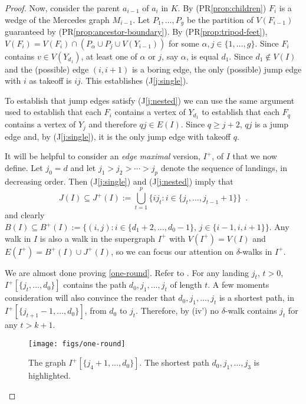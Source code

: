 \documentclass{patmorin}
\renewcommand{\propref}[1]{(PR\ref{prop:#1})}
\newcommand{\jref}[1]{(J\ref{j:#1})}
\begin{document}
\begin{proof}
  Now, consider the parent $a_{i-1}$ of $a_i$ in $K$.  By \propref{children} $F_i$ is a wedge of the Mercedes graph $M_{i-1}$.  Let $P_1,\ldots,P_g$ be the partition of $V(F_{i-1})$ guaranteed by \propref{ancestor-boundary}.
  By \propref{tripod-feet}, $V(F_i) = V(F_i)\cap(P_\alpha \cup P_j\cup V(Y_{i-1}))$ for some $\alpha,j\in \{1,\ldots,g\}$.  Since $F_i$ contains $v\in V(Y_{d_1})$, at least one of $\alpha$ or $j$, say $\alpha$, is equal $d_1$. Since $d_1\not\in V(I)$ and the (possible) edge $(i,i+1)$ is a boring edge, the only (possible) jump edge with $i$ as takeoff is $ij$. This establishes \jref{single}. 
  
  To establish that jump edges satisfy \jref{nested} we can use the same argument used to establish that each $F_i$ contains a vertex of $Y_{d_1}$ to establish that each $F_q$ contains a vertex of $Y_j$ and therefore $qj\in E(I)$.  Since $q \ge j+2$, $qj$ is a jump edge and, by \jref{single}, it is the only jump edge with takeoff $q$. 

  It will be helpful to consider an \emph{edge maximal} version, $I^+$, of $I$ that we now define.  Let $j_0=d$ and let $j_1>j_2>\cdots> j_p$ denote the sequence of landings, in decreasing order.  Then \jref{single} and \jref{nested} imply that
  \[
      J(I) \subseteq J^+(I) :=
         \bigcup_{t=1}^p \{ ij_t : i\in\{ j_t,\ldots,j_{t-1}+1 \}\} \enspace . 
  \]
  and clearly $B(I)\subseteq B^+(I) := \{(i,j): i\in\{d_1+2,\ldots,d_0-1\},\, j\in\{i-1,i,i+1\}\}$.
  Any walk in $I$ is also a walk in the supergraph $I^+$ with $V(I^+)=V(I)$ and $E(I^+)=B^+(I)\cup J^+(I)$, so we can focus our attention on $\delta$-walks in $I^+$.
  
  We are almost done proving \eqref{one-round}. Refer to .  For any landing $j_t$, $t>0$, $I^+[\{j_t,\ldots,d_0\}]$ contains the path $d_0,j_1,\ldots,j_t$ of length $t$.  A few moments consideration will also convince the reader that $d_0,j_1,\ldots,j_t$ is a shortest path, in $I^+[\{j_{t+1}-1,\ldots,d_0\}]$, from $d_0$ to $j_t$.  Therefore, by (iv') no $\delta$-walk contains $j_t$ for any $t> k+1$.
  
  \begin{figure}
    \begin{center}
      \texttt{[image: figs/one-round]}
    \end{center}
    \caption{The graph $I^+[\{j_{4}+1,\ldots,d_0\}]$.  The shortest path $d_0,j_1,\ldots,j_3$ is highlighted.}
  \end{figure}
  

\end{proof}
\end{document}
